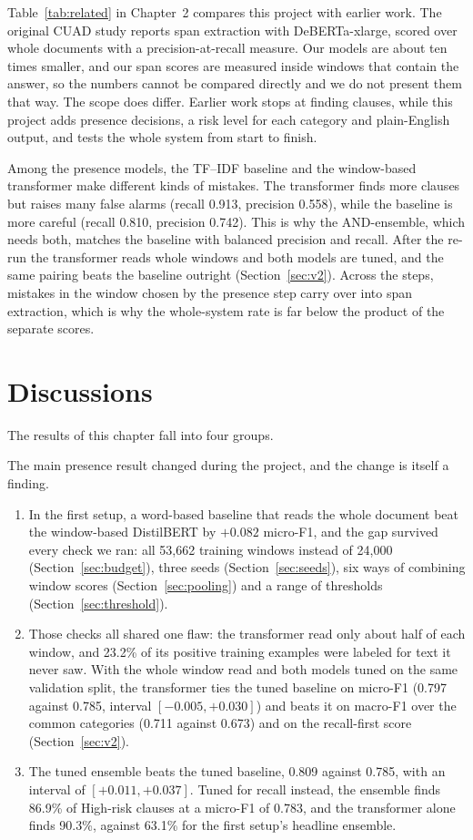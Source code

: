 Table~\ref{tab:related} in Chapter~2 compares this project with earlier work. The original CUAD study reports span extraction with DeBERTa-xlarge, scored over whole documents with a precision-at-recall measure. Our models are about ten times smaller, and our span scores are measured inside windows that contain the answer, so the numbers cannot be compared directly and we do not present them that way. The scope does differ. Earlier work stops at finding clauses, while this project adds presence decisions, a risk level for each category and plain-English output, and tests the whole system from start to finish.

Among the presence models, the TF--IDF baseline and the window-based transformer make different kinds of mistakes. The transformer finds more clauses but raises many false alarms (recall 0.913, precision 0.558), while the baseline is more careful (recall 0.810, precision 0.742). This is why the AND-ensemble, which needs both, matches the baseline with balanced precision and recall. After the re-run the transformer reads whole windows and both models are tuned, and the same pairing beats the baseline outright (Section~\ref{sec:v2}). Across the steps, mistakes in the window chosen by the presence step carry over into span extraction, which is why the whole-system rate is far below the product of the separate scores.

\section{Discussions}
The results of this chapter fall into four groups.

The main presence result changed during the project, and the change is itself a finding.
\begin{enumerate}[itemsep=2pt]
  \item In the first setup, a word-based baseline that reads the whole document beat the window-based DistilBERT by $+0.082$ micro-F1, and the gap survived every check we ran: all 53{,}662 training windows instead of 24{,}000 (Section~\ref{sec:budget}), three seeds (Section~\ref{sec:seeds}), six ways of combining window scores (Section~\ref{sec:pooling}) and a range of thresholds (Section~\ref{sec:threshold}).
  \item Those checks all shared one flaw: the transformer read only about half of each window, and 23.2\% of its positive training examples were labeled for text it never saw. With the whole window read and both models tuned on the same validation split, the transformer ties the tuned baseline on micro-F1 (0.797 against 0.785, interval $[-0.005, +0.030]$) and beats it on macro-F1 over the common categories (0.711 against 0.673) and on the recall-first score (Section~\ref{sec:v2}).
  \item The tuned ensemble beats the tuned baseline, 0.809 against 0.785, with an interval of $[+0.011, +0.037]$. Tuned for recall instead, the ensemble finds 86.9\% of High-risk clauses at a micro-F1 of 0.783, and the transformer alone finds 90.3\%, against 63.1\% for the first setup's headline ensemble.
\end{enumerate}

